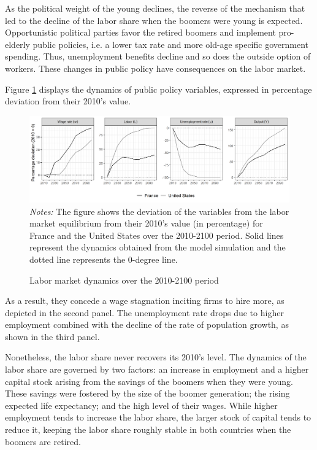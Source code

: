 As the political weight of the young declines, the reverse of the mechanism that led to the decline of the labor share when the boomers were young is expected. Opportunistic political parties favor the retired boomers and implement pro-elderly public policies, i.e. a lower tax rate and more old-age specific government spending. Thus, unemployment benefits decline and so does the outside option of workers. These changes in public policy have consequences on the labor market.

Figure \ref{chap1-fig:quant-bench-dev1000-labor} displays the dynamics of public policy variables, expressed in percentage deviation from their 2010's value.
\begin{figure}[!tb]
	\centering
	\caption{Labor market dynamics over the 2010-2100 period} \label{chap1-fig:quant-bench-dev1000-labor}
	\includegraphics[width=1\linewidth]{chap1/graphic/quant-bench-dev1000-labor.png}
	\vspace{-3em}
	\justify\singlespacing\footnotesize\textit{Notes:} The figure shows the deviation of the variables from the labor market equilibrium from their 2010's value (in percentage) for France and the United States over the 2010-2100 period. Solid lines represent the dynamics obtained from the model simulation and the dotted line represents the 0-degree line.
\end{figure}
As a result, they concede a wage stagnation inciting firms to hire more, as depicted in the second panel. The unemployment rate drops due to higher employment combined with the decline of the rate of population growth, as shown in the third panel.

Nonetheless, the labor share never recovers its 2010's level. The dynamics of the labor share are governed by two factors: an increase in employment and a higher capital stock arising from the savings of the boomers when they were young. These savings were fostered by the size of the boomer generation; the rising expected life expectancy; and the high level of their wages. While higher employment tends to increase the labor share, the larger stock of capital tends to reduce it, keeping the labor share roughly stable in both countries when the boomers are retired.

